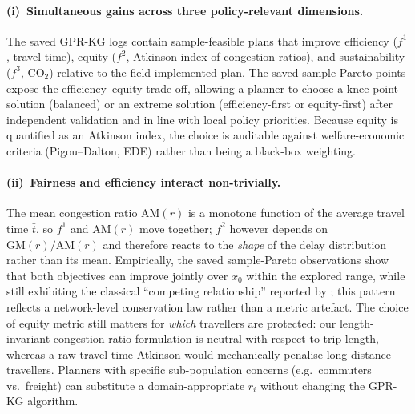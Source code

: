 \documentclass[12pt]{article}
\theoremstyle{plain}
\theoremstyle{definition}
\theoremstyle{remark}
\begin{document}
\paragraph{(i)~Simultaneous gains across three policy-relevant
dimensions.}
The saved GPR-KG logs contain sample-feasible plans that improve
efficiency ($f^{1}$, travel time), equity ($f^{2}$, Atkinson index of
congestion ratios), and sustainability ($f^{3}$, CO$_{2}$) relative to
the field-implemented plan.  The saved sample-Pareto points expose the efficiency--equity
trade-off, allowing a planner to choose
a knee-point solution (balanced) or an extreme solution
(efficiency-first or equity-first) after independent validation and in
line with local policy priorities.  Because equity is quantified as an
Atkinson index, the
choice is auditable against welfare-economic criteria
(Pigou--Dalton, EDE) rather than being a black-box weighting.

\paragraph{(ii)~Fairness and efficiency interact non-trivially.}
The mean congestion ratio $\mathrm{AM}(r)$ is a monotone function of
the average travel time $\bar{t}$, so $f^{1}$ and $\mathrm{AM}(r)$
move together; $f^{2}$ however depends on $\mathrm{GM}(r)/\mathrm{AM}(r)$
and therefore reacts to the \emph{shape} of the delay distribution
rather than its mean.  Empirically, the saved sample-Pareto observations
show that both objectives can improve jointly over $x_{0}$ within the
explored range, while still exhibiting the classical ``competing
relationship''
reported by \citep{ZhengXueXuRan2019a}; this pattern reflects a network-level
conservation law rather than a metric artefact.  The choice of equity
metric still matters for \emph{which} travellers are protected:
our length-invariant congestion-ratio formulation is neutral with
respect to trip length, whereas a raw-travel-time Atkinson would
mechanically penalise long-distance travellers.  Planners with
specific sub-population concerns (e.g.\ commuters vs.\ freight) can
substitute a domain-appropriate $r_{i}$ without changing the GPR-KG
algorithm.
\end{document}
